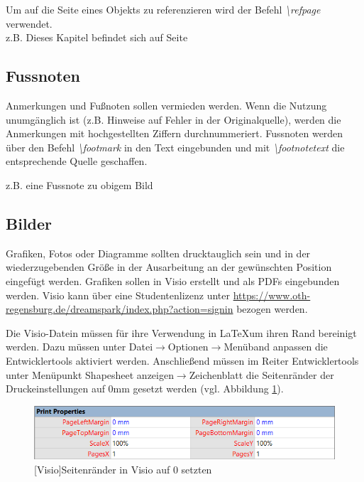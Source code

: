 \documentclass[12pt,a4paper, listof=entryprefix, bibliography=totocnumbered,toc=listofnumbered,lof=listofnumbered]{scrartcl}
\begin{document}
Um auf die Seite eines Objekts zu referenzieren wird der Befehl \textit{\textbackslash refpage} verwendet.\\
z.B. Dieses Kapitel befindet sich auf Seite \pageref{ch:referenz}

\subsection{Fussnoten}
\label{ch:fussnoten}
Anmerkungen und Fußnoten sollen vermieden werden. Wenn die Nutzung unumgänglich ist (z.B. Hinweise auf Fehler in der Originalquelle), werden die Anmerkungen mit hochgestellten Ziffern durchnummeriert. Fussnoten werden über den Befehl \textit{\textbackslash footmark} in den Text eingebunden und mit \textit{\textbackslash footnotetext} die entsprechende Quelle geschaffen. 

z.B. eine Fussnote zu obigem Bild \footnotemark 

\subsection{Bilder}
\label{ch:bilder}
Grafiken, Fotos oder Diagramme sollten drucktauglich sein und in der wiederzugebenden Größe in der Ausarbeitung an der gewünschten Position eingefügt werden. Grafiken sollen in Visio erstellt und als PDFs eingebunden werden. Visio kann über eine Studentenlizenz unter \url{https://www.oth-regensburg.de/dreamspark/index.php?action=signin} bezogen werden.

Die Visio-Datein müssen für ihre Verwendung in \LaTeX um ihren Rand bereinigt werden. Dazu müssen unter Datei$\rightarrow$Optionen$\rightarrow$Menüband anpassen die Entwicklertools aktiviert werden. Anschließend müssen im Reiter Entwicklertools unter Menüpunkt Shapesheet anzeigen$\rightarrow$Zeichenblatt die Seitenränder der Druckeinstellungen auf 0mm gesetzt werden (vgl. Abbildung \ref{fig:visio}).

\begin{figure}[H]
	\centering
	\includegraphics[width=0.8\linewidth]{Bilder/Visio.png} 
	[Visio]{Seitenränder in Visio auf 0 setzten}
	\label{fig:visio}
\end{figure}
\end{document}
